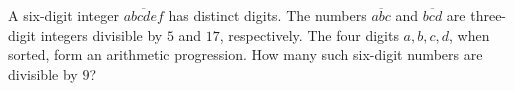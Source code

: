 A six-digit integer $\overline{abcdef}$ has distinct digits. The numbers $\overline{abc}$ and $\overline{bcd}$ are three-digit integers divisible by $5$ and $17$, respectively. The four digits $a,b,c,d$, when sorted, form an arithmetic progression. How many such six-digit numbers are divisible by $9$?
